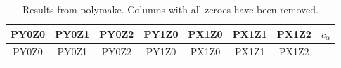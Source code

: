 \documentclass[
]{article}
\theoremstyle{plain}
\begin{document}
{\begin{longtable}[]{@{}cccccccc@{}}
\caption{Results from polymake. Columns with all zeroes have been removed.}\tabularnewline
\toprule
\begin{minipage}[b]{0.09\columnwidth}\centering
PY0Z0\strut
\end{minipage} & \begin{minipage}[b]{0.09\columnwidth}\centering
PY0Z1\strut
\end{minipage} & \begin{minipage}[b]{0.09\columnwidth}\centering
PY0Z2\strut
\end{minipage} & \begin{minipage}[b]{0.09\columnwidth}\centering
PY1Z0\strut
\end{minipage} & \begin{minipage}[b]{0.09\columnwidth}\centering
PX1Z0\strut
\end{minipage} & \begin{minipage}[b]{0.09\columnwidth}\centering
PX1Z1\strut
\end{minipage} & \begin{minipage}[b]{0.09\columnwidth}\centering
PX1Z2\strut
\end{minipage} & \begin{minipage}[b]{0.16\columnwidth}\centering
\(c_{\alpha}\)\strut
\end{minipage}\tabularnewline
\midrule
\endfirsthead
\toprule
\begin{minipage}[b]{0.09\columnwidth}\centering
PY0Z0\strut
\end{minipage} & \begin{minipage}[b]{0.09\columnwidth}\centering
PY0Z1\strut
\end{minipage} & \begin{minipage}[b]{0.09\columnwidth}\centering
PY0Z2\strut
\end{minipage} & \begin{minipage}[b]{0.09\columnwidth}\centering
PY1Z0\strut
\end{minipage} & \begin{minipage}[b]{0.09\columnwidth}\centering
PX1Z0\strut
\end{minipage} & \begin{minipage}[b]{0.09\columnwidth}\centering
PX1Z1\strut
\end{minipage} & \begin{minipage}[b]{0.09\columnwidth}\centering
PX1Z2\strut
\end{minipage} & \begin{minipage}[b]{0.16\columnwidth}\centering

\end{minipage}
\end{longtable}}
\end{document}
